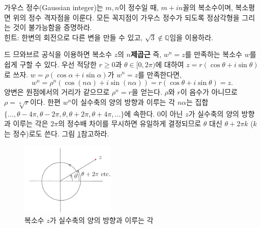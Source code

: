 \begin{salt_exercise} \label{ex-1-8}
가우스 정수(Gaussian integer)는 
$m, n$이 정수일 때, $m+in$꼴의 복소수이며,
복소평면 위의 정수 격자점을 이룬다.
모든 꼭지점이 가우스 정수가 되도록 정삼각형을 그리는 것이 불가능함을 증명하라. \\[1ex]
힌트: 한변의 회전으로 다른 변을 만들 수 있고, $\sqrt{3}\not\in \mathbb Q$임을 이용하라.
\end{salt_exercise}

드 므와브르 공식을 이용하면
복소수  $z$의 $n$\textbf{제곱근}
즉, $w^n=z$를 만족하는 복소수 $w$를 쉽게 구할 수 있다.
우선 적당한 $r\ge0$과 $\theta\in[0,2\pi)$에 대하여 $z=r(\cos\theta + i \sin\theta)$로 쓰자.
$w= \rho(\cos\alpha + i\sin\alpha)$가 $w^n=z$를 만족한다면,
$$
w^n = \rho^n\left( \cos(n\alpha) + i\sin(n\alpha)\right) = r(\cos\theta + i\sin\theta)= z.
$$
양변은 원점에서의 거리가 같으므로 $\rho^n=r$을 얻는다.
$\rho$와 $r$이 음수가 아니므로 $\rho = \sqrt[n]{r}$이다.
한편 $w^n$이 실수축의 양의 방향과 이루는 각 $n\alpha$는 
집합 $ \{ \ldots, \theta - 4\pi, \theta - 2\pi, \theta, \theta+2\pi, \theta+4\pi, \ldots\} $에 속한다.
$0$이 아닌 $z$가 실수축의 양의 방향과 이루는 각은 $2\pi$의 정수배 차이를 무시하면 유일하게 결정되므로
$\theta$ 대신 $\theta + 2\pi k$ ($k$는 정수)로도 쓴다. 그림 \ref{fig-1-7}\을 참고하라.

\begin{figure}[!h]
\begin{center}
\includegraphics[width=0.4\textwidth]{./SaltChapter/figs/fig-1-7}
\end{center}
\caption{복소수 $z$가 실수축의 양의 방향과 이루는 각}
\label{fig-1-7}
\end{figure}


